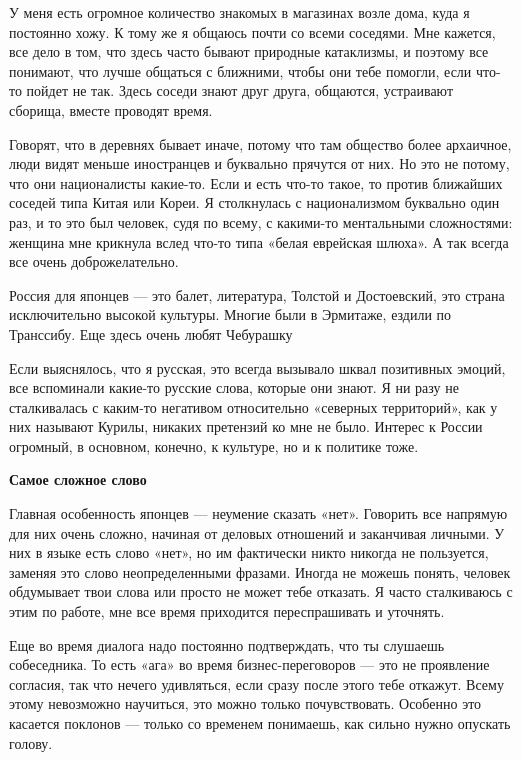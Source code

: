 У меня есть огромное количество знакомых в магазинах возле дома, куда я постоянно хожу. К тому же я общаюсь почти со всеми соседями. Мне кажется, все дело в том, что здесь часто бывают природные катаклизмы, и поэтому все понимают, что лучше общаться с ближними, чтобы они тебе помогли, если что-то пойдет не так. Здесь соседи знают друг друга, общаются, устраивают сборища, вместе проводят время.

Говорят, что в деревнях бывает иначе, потому что там общество более архаичное, люди видят меньше иностранцев и буквально прячутся от них. Но это не потому, что они националисты какие-то. Если и есть что-то такое, то против ближайших соседей типа Китая или Кореи. Я столкнулась с национализмом буквально один раз, и то это был человек, судя по всему, с какими-то ментальными сложностями: женщина мне крикнула вслед что-то типа «белая еврейская шлюха». А так всегда все очень доброжелательно.

\begin{fancyquotes}
    Россия для японцев — это балет, литература, Толстой и Достоевский, это страна исключительно высокой культуры. Многие были в Эрмитаже, ездили по Транссибу. Еще здесь очень любят Чебурашку
\end{fancyquotes}

Если выяснялось, что я русская, это всегда вызывало шквал позитивных эмоций, все вспоминали какие-то русские слова, которые они знают. Я ни разу не сталкивалась с каким-то негативом относительно «северных территорий», как у них называют Курилы, никаких претензий ко мне не было. Интерес к России огромный, в основном, конечно, к культуре, но и к политике тоже.

\textbf{Самое сложное слово}

Главная особенность японцев — неумение сказать «нет». Говорить все напрямую для них очень сложно, начиная от деловых отношений и заканчивая личными. У них в языке есть слово «нет», но им фактически никто никогда не пользуется, заменяя это слово неопределенными фразами. Иногда не можешь понять, человек обдумывает твои слова или просто не может тебе отказать. Я часто сталкиваюсь с этим по работе, мне все время приходится переспрашивать и уточнять.

Еще во время диалога надо постоянно подтверждать, что ты слушаешь собеседника. То есть «ага» во время бизнес-переговоров — это не проявление согласия, так что нечего удивляться, если сразу после этого тебе откажут. Всему этому невозможно научиться, это можно только почувствовать. Особенно это касается поклонов — только со временем понимаешь, как сильно нужно опускать голову.

